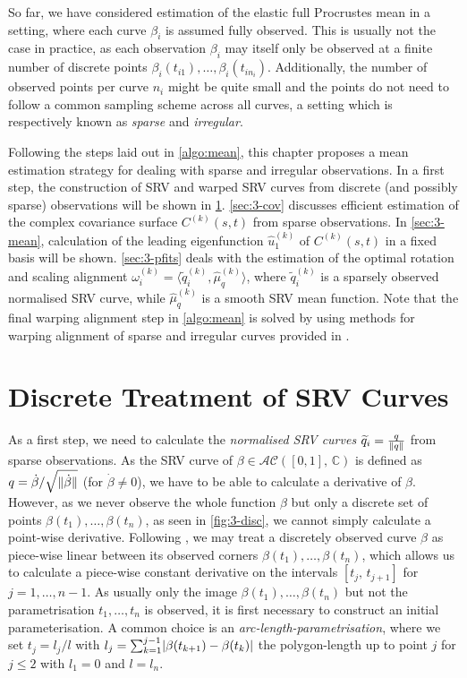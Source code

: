\label{sec:3}
So far, we have considered estimation of the elastic full Procrustes mean in a setting, where each curve $\beta_i$ is assumed fully observed.
This is usually not the case in practice, as each observation $\beta_i$ may itself only be observed at a finite number of discrete points $\beta_i(t_{i1}), \dots, \beta_i(t_{in_i})$.
Additionally, the number of observed points per curve $n_i$ might be quite small and the points do not need to follow a common sampling scheme across all curves, a setting which is respectively known as \emph{sparse} and \emph{irregular}.

Following the steps laid out in \cref{algo:mean}, this chapter proposes a mean estimation strategy for dealing with sparse and irregular observations.
In a first step, the construction of SRV and warped SRV curves from discrete (and possibly sparse) observations will be shown in \cref{sec:3-discrete}.
\cref{sec:3-cov} discusses efficient estimation of the complex covariance surface $C^{(k)}(s,t)$ from sparse observations.
In \cref{sec:3-mean}, calculation of the leading eigenfunction $\hat u^{(k)}_1$ of $C^{(k)}(s,t)$ in a fixed basis will be shown.
\cref{sec:3-pfits} deals with the estimation of the optimal rotation and scaling alignment $\omega_i^{(k)} = \langle \widetilde q_i^{(k)}, \hat\mu^{(k)}_q \rangle$, where $\widetilde q_i^{(k)}$ is a sparsely observed normalised SRV curve, while $\hat\mu^{(k)}_q$ is a smooth SRV mean function.
Note that the final warping alignment step in \cref{algo:mean} is solved by using methods for warping alignment of sparse and irregular curves provided in \cite{Steyer2021}.


\section{Discrete Treatment of SRV Curves}
\label{sec:3-discrete}
As a first step, we need to calculate the \emph{normalised SRV curves} $\widetilde q_i = \frac{q}{\lVert q\rVert}$ from sparse observations.
As the SRV curve of $\beta \in \mathcal{AC}([0,1],\,\mathbb{C})$ is defined as $q = \dot\beta / \sqrt{\lVert\dot\beta\rVert}$ (for $\dot\beta \neq 0$), we have to be able to calculate a derivative of $\beta$.
However, as we never observe the whole function $\beta$ but only a discrete set of points $\beta(t_1),\dots,\beta(t_n)$, as seen in \cref{fig:3-disc}, we cannot simply calculate a point-wise derivative.
Following \cite{Steyer2021}, we may treat a discretely observed curve $\beta$ as piece-wise linear between its observed corners $\beta(t_1),\dots,\beta(t_n)$, which allows us to calculate a piece-wise constant derivative on the intervals $[t_j,\,t_{j+1}]$ for $j=1,\dots,n-1$.
As usually only the image $\beta(t_1),\dots,\beta(t_n)$ but not the parametrisation $t_1,\dots,t_n$ is observed, it is first necessary to construct an initial parameterisation.
A common choice is an \emph{arc-length-parametrisation}, where we set $t_j = l_j/l$ with $l_j = \sum_{k=1}^{j-1} \lvert\beta(t_{k+1}) - \beta(t_k)\rvert$ the polygon-length up to point $j$ for $j \leq 2$ with $l_1 = 0$ and $l= l_n$.

